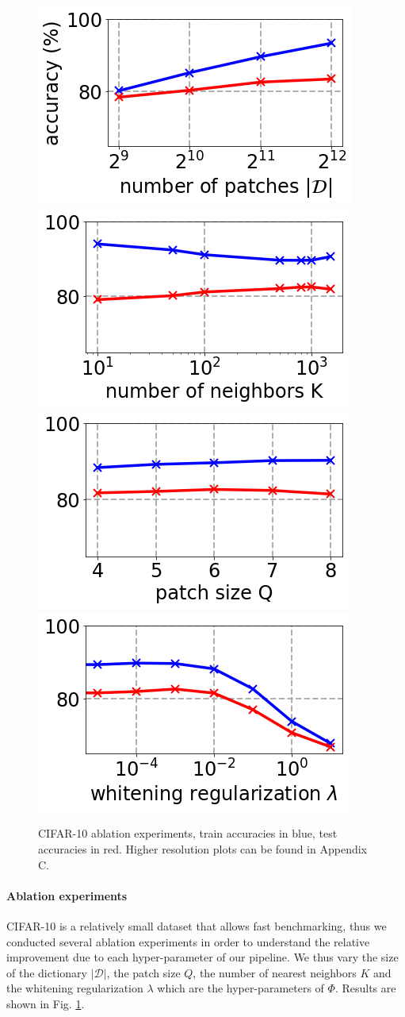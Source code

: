 \documentclass{article}
\newcommand{\Edouard}[1]{\textcolor{blue}{#1}}
\begin{document}
\begin{figure} 
    \centering
    \includegraphics[width=0.245\linewidth]{figures/ablation_npatches.png}
    \includegraphics[width=0.245\linewidth]{figures/ablation_K.png}
    \includegraphics[width=0.245\linewidth]{figures/ablation_Q.png}
    \includegraphics[width=0.245\linewidth]{figures/ablation_lambda.png}\\
    \caption{
        CIFAR-10 ablation experiments, train accuracies in blue, test accuracies in red. Higher resolution plots can be found in  Appendix C.}
    \label{fig:ablation_study}
\end{figure}
\vspace{-0.3cm}
\paragraph{Ablation experiments}
CIFAR-10 is a relatively small dataset that allows fast benchmarking, thus we conducted several ablation experiments in order to understand the relative improvement due to each hyper-parameter of our pipeline. We thus vary the size of the dictionary $|\mathcal{D}|$, the patch size $Q$, the number of nearest neighbors $K$ and the whitening regularization $\lambda$ which are the hyper-parameters of $\Phi$. Results are shown in Fig. \ref{fig:ablation_study}.


\end{document}
